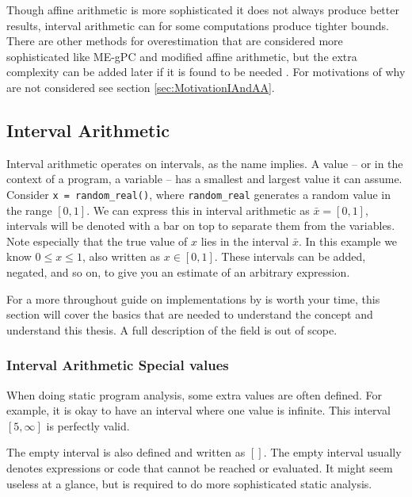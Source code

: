 Though affine arithmetic is more sophisticated it does not always produce better results, interval arithmetic can for some computations produce tighter bounds. There are other methods for overestimation that are considered more sophisticated like ME-gPC and modified affine arithmetic, but the extra complexity can be added later if it is found to be needed \cite{src:MEgPC}. For motivations of why are not considered see section \ref{sec:MotivationIAndAA}.

\subsection{Interval Arithmetic}
Interval arithmetic operates on intervals, as the name implies. A value -- or in the context of a program, a variable -- has a smallest and largest value it can assume. Consider \verb`x = random_real()`, where \verb`random_real` generates a random value in the range $[0, 1]$. We can express this in interval arithmetic as $\bar{x} = [0, 1]$, intervals will be denoted with a bar on top to separate them from the variables. Note especially that the true value of $x$ lies in the interval $\bar{x}$. In this example we know $0 \leq x \leq 1$, also written as $x \in [0, 1]$. These intervals can be added, negated, and so on, to give you an estimate of an arbitrary expression.

For a more throughout guide on implementations  by \citeauthor{src:affAri} is worth your time, this section will cover the basics that are needed to understand the concept and understand this thesis. A full description of the field is out of scope.


\subsubsection{Interval Arithmetic Special values}
When doing static program analysis, some extra values are often defined. For example, it is okay to have an interval where one value is infinite. This interval $[5, \infty]$ is perfectly valid.

The empty interval is also defined and written as $[]$. The empty interval usually denotes expressions or code that cannot be reached or evaluated. It might seem useless at a glance, but is required to do more sophisticated static analysis.

